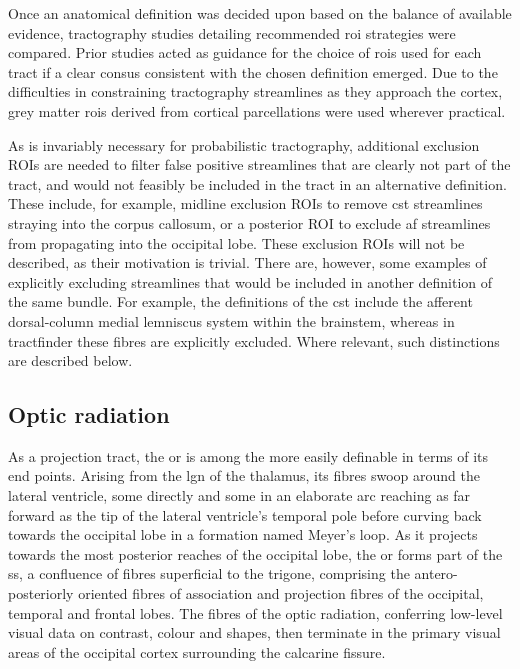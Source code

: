 Once an anatomical definition was decided upon based on the balance of available evidence, tractography studies detailing recommended \gls{roi} strategies were compared.
Prior studies acted as guidance for the choice of \glspl{roi} used for each tract if a clear consus consistent with the chosen definition emerged.
Due to the difficulties in constraining tractography streamlines as they approach the cortex, grey matter \glspl{roi} derived from cortical parcellations were used wherever practical.

As is invariably necessary for probabilistic tractography, additional exclusion ROIs are needed to filter false positive streamlines that are clearly not part of the tract, and would not feasibly be included in the tract in an alternative definition.
These include, for example, midline exclusion ROIs to remove \gls{cst} streamlines straying into the corpus callosum, or a posterior ROI to exclude \gls{af} streamlines from propagating into the occipital lobe.
These exclusion ROIs will not be described, as their motivation is trivial.
There are, however, some examples of explicitly excluding streamlines that would be included in another definition of the same bundle.
For example, the definitions of the \gls{cst} include the afferent dorsal-column medial lemniscus system within the brainstem, whereas in tractfinder these fibres are explicitly excluded.
Where relevant, such distinctions are described below.

\subsection{Optic radiation}

As a projection tract, the \gls{or} is among the more easily definable in terms of its end points.
Arising from the \gls{lgn} of the thalamus, its fibres swoop around the lateral ventricle, some directly and some in an elaborate arc reaching as far forward as the tip of the lateral ventricle's temporal pole before curving back towards the occipital lobe in a formation named Meyer's loop.\autocite{Sarubbo2015}
As it projects towards the most posterior reaches of the occipital lobe, the \gls{or} forms part of the \gls{ss}, a confluence of fibres superficial to the \gls{trigone}, comprising the antero-posteriorly oriented fibres of association and projection fibres of the occipital, temporal and frontal lobes.\autocite{Maldonado2021}
The fibres of the optic radiation, conferring low-level visual data on contrast, colour and shapes, then terminate in the primary visual areas of the occipital cortex surrounding the calcarine fissure.

